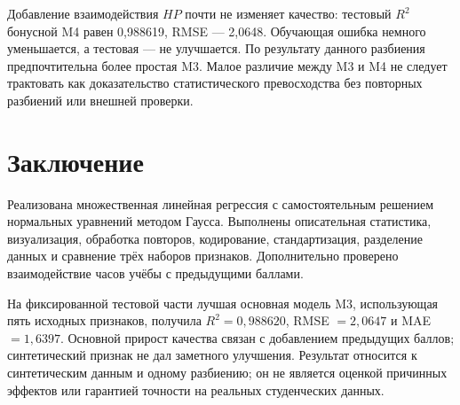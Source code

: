 Добавление взаимодействия $HP$ почти не изменяет качество:
тестовый $R^2$ бонусной M4 равен 0,988619, RMSE --- 2,0648.
Обучающая ошибка немного уменьшается, а тестовая --- не улучшается.
По результату данного разбиения предпочтительна более простая M3.
Малое различие между M3 и M4 не следует трактовать как доказательство
статистического превосходства без повторных разбиений или внешней проверки.

\section{Заключение}

Реализована множественная линейная регрессия с самостоятельным решением
нормальных уравнений методом Гаусса. Выполнены описательная статистика,
визуализация, обработка повторов, кодирование, стандартизация, разделение
данных и сравнение трёх наборов признаков. Дополнительно проверено
взаимодействие часов учёбы с предыдущими баллами.

На фиксированной тестовой части лучшая основная модель M3, использующая
пять исходных признаков, получила $R^2=0{,}988620$,
RMSE $=2{,}0647$ и MAE $=1{,}6397$. Основной прирост качества связан
с добавлением предыдущих баллов; синтетический признак не дал заметного
улучшения. Результат относится к синтетическим данным и одному разбиению;
он не является оценкой причинных эффектов или гарантией точности на
реальных студенческих данных.
